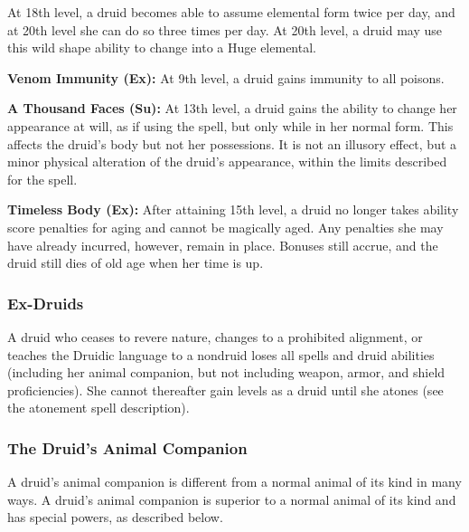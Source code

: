 At 18th level, a druid becomes able to assume elemental form twice per day, and at 20th level she can do so three times per day. At 20th level, a druid may use this wild shape ability to change into a Huge elemental.

\textbf{Venom Immunity (Ex):} At 9th level, a druid gains immunity to all poisons.

\textbf{A Thousand Faces (Su):} At 13th level, a druid gains the ability to change her appearance at will, as if using the  spell, but only while in her normal form. This affects the druid's body but not her possessions. It is not an illusory effect, but a minor physical alteration of the druid's appearance, within the limits described for the spell.

\textbf{Timeless Body (Ex):} After attaining 15th level, a druid no longer takes ability score penalties for aging and cannot be magically aged. Any penalties she may have already incurred, however, remain in place. Bonuses still accrue, and the druid still dies of old age when her time is up.

\subsubsection{Ex-Druids}
A druid who ceases to revere nature, changes to a prohibited alignment, or teaches the Druidic language to a nondruid loses all spells and druid abilities (including her animal companion, but not including weapon, armor, and shield proficiencies). She cannot thereafter gain levels as a druid until she atones (see the atonement spell description).

\subsubsection{The Druid's Animal Companion}
A druid's animal companion is different from a normal animal of its kind in many ways. A druid's animal companion is superior to a normal animal of its kind and has special powers, as described below.


